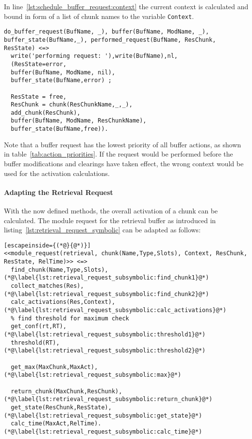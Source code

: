 In line~\ref{lst:schedule_buffer_request:context} the current context is calculated and bound in form of a list of chunk names to the variable \lstinline|Context|.
  
\begin{lstlisting}[caption=Apply the results of the buffer request]
do_buffer_request(BufName, _), buffer(BufName, ModName, _), buffer_state(BufName,_), performed_request(BufName, ResChunk, ResState) <=>  
  write('performing request: '),write(BufName),nl,
  (ResState=error, 
  buffer(BufName, ModName, nil),
  buffer_state(BufName,error) ;  
  
  ResState = free,
  ResChunk = chunk(ResChunkName,_,_),
  add_chunk(ResChunk), 
  buffer(BufName, ModName, ResChunkName),
  buffer_state(BufName,free)).  
\end{lstlisting}

Note that a buffer request has the lowest priority of all buffer actions, as shown in table~\ref{tab:action_priorities}. If the request would be performed before the buffer modifications and clearings have taken effect, the wrong context would be used for the activation calculations.

\paragraph{Adapting the Retrieval Request}

With the now defined methods, the overall activation of a chunk can be calculated. The module request for the retrieval buffer as introduced in listing~\ref{lst:retrieval_request_symbolic} can be adapted as follows:

\begin{lstlisting}[escapeinside={(*@}{@*)}]
<<module_request(retrieval, chunk(Name,Type,Slots), Context, ResChunk, ResState, RelTime)>> <=> 
  find_chunk(Name,Type,Slots), (*@\label{lst:retrieval_request_subsymbolic:find_chunk1}@*)
  collect_matches(Res), (*@\label{lst:retrieval_request_subsymbolic:find_chunk2}@*)
  calc_activations(Res,Context), (*@\label{lst:retrieval_request_subsymbolic:calc_activations}@*)
  % find threshold for maximum check
  get_conf(rt,RT), (*@\label{lst:retrieval_request_subsymbolic:threshold1}@*)
  threshold(RT), (*@\label{lst:retrieval_request_subsymbolic:threshold2}@*)
  
  get_max(MaxChunk,MaxAct), (*@\label{lst:retrieval_request_subsymbolic:max}@*)
  
  return_chunk(MaxChunk,ResChunk), (*@\label{lst:retrieval_request_subsymbolic:return_chunk}@*)
  get_state(ResChunk,ResState), (*@\label{lst:retrieval_request_subsymbolic:get_state}@*)
  calc_time(MaxAct,RelTime). (*@\label{lst:retrieval_request_subsymbolic:calc_time}@*)
\end{lstlisting}

